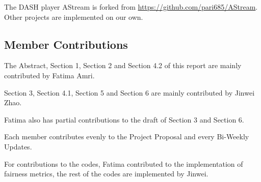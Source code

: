 \documentclass[12pt]{article}
\begin{document}
The DASH player AStream is forked from \url{https://github.com/pari685/AStream}. Other projects are implemented on our own.


\subsection{Member Contributions}
The Abstract, Section 1, Section 2 and Section 4.2 of this report are mainly contributed by Fatima Amri. 

Section 3, Section 4.1, Section 5 and Section 6 are mainly contributed by Jinwei Zhao. 

Fatima also has partial contributions to the draft of Section 3 and Section 6. 

Each member contributes evenly to the Project Proposal and every Bi-Weekly Updates.

For contributions to the codes, Fatima contributed to the implementation of fairness metrics, the rest of the codes are implemented by Jinwei.
\end{document}
